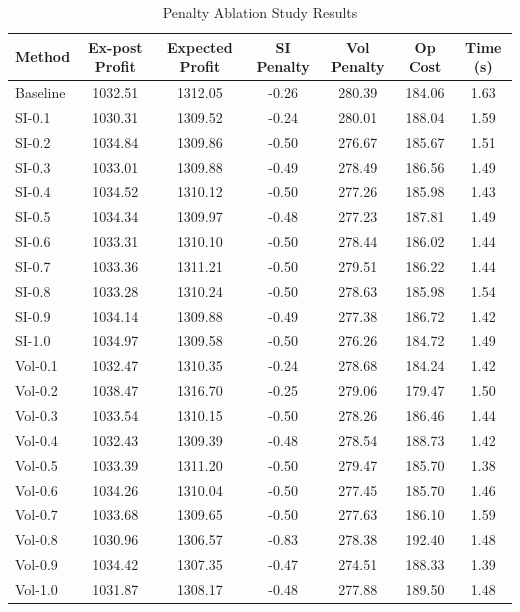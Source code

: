 
\begin{table}[htbp]
\centering
\caption{Penalty Ablation Study Results}
\begin{tabular}{lcccccc}
\toprule
Method & Ex-post Profit & Expected Profit & SI Penalty & Vol Penalty & Op Cost & Time (s) \\
\midrule
Baseline & 1032.51 & 1312.05 & -0.26 & 280.39 & 184.06 & 1.63 \\
SI-0.1 & 1030.31 & 1309.52 & -0.24 & 280.01 & 188.04 & 1.59 \\
SI-0.2 & 1034.84 & 1309.86 & -0.50 & 276.67 & 185.67 & 1.51 \\
SI-0.3 & 1033.01 & 1309.88 & -0.49 & 278.49 & 186.56 & 1.49 \\
SI-0.4 & 1034.52 & 1310.12 & -0.50 & 277.26 & 185.98 & 1.43 \\
SI-0.5 & 1034.34 & 1309.97 & -0.48 & 277.23 & 187.81 & 1.49 \\
SI-0.6 & 1033.31 & 1310.10 & -0.50 & 278.44 & 186.02 & 1.44 \\
SI-0.7 & 1033.36 & 1311.21 & -0.50 & 279.51 & 186.22 & 1.44 \\
SI-0.8 & 1033.28 & 1310.24 & -0.50 & 278.63 & 185.98 & 1.54 \\
SI-0.9 & 1034.14 & 1309.88 & -0.49 & 277.38 & 186.72 & 1.42 \\
SI-1.0 & 1034.97 & 1309.58 & -0.50 & 276.26 & 184.72 & 1.49 \\
Vol-0.1 & 1032.47 & 1310.35 & -0.24 & 278.68 & 184.24 & 1.42 \\
Vol-0.2 & 1038.47 & 1316.70 & -0.25 & 279.06 & 179.47 & 1.50 \\
Vol-0.3 & 1033.54 & 1310.15 & -0.50 & 278.26 & 186.46 & 1.44 \\
Vol-0.4 & 1032.43 & 1309.39 & -0.48 & 278.54 & 188.73 & 1.42 \\
Vol-0.5 & 1033.39 & 1311.20 & -0.50 & 279.47 & 185.70 & 1.38 \\
Vol-0.6 & 1034.26 & 1310.04 & -0.50 & 277.45 & 185.70 & 1.46 \\
Vol-0.7 & 1033.68 & 1309.65 & -0.50 & 277.63 & 186.10 & 1.59 \\
Vol-0.8 & 1030.96 & 1306.57 & -0.83 & 278.38 & 192.40 & 1.48 \\
Vol-0.9 & 1034.42 & 1307.35 & -0.47 & 274.51 & 188.33 & 1.39 \\
Vol-1.0 & 1031.87 & 1308.17 & -0.48 & 277.88 & 189.50 & 1.48 \\

\bottomrule
\end{tabular}
\label{tab:penalty_ablation}
\end{table}
